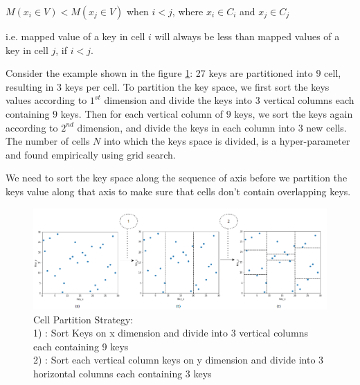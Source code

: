     $ M(x_{i} \in V) <  M(x_{j} \in V)$ when $i<j$, where $x_{i} \in C_{i}$ and $x_{j} \in C_{j}$ 
    
i.e. mapped value of a key in cell $i$ will always be less than mapped values of a key in cell $j$, if $i <j$.

\begin{mscexample}
	Consider the example shown in the figure \ref{fig:Cell_Parttion}: 27 keys are partitioned into $9$ cell, resulting in $3$ keys per cell. To partition the key space, we first sort the keys values according to $1^{st}$ dimension and divide the keys into $3$ vertical columns each containing $9$ keys. Then for each vertical column of $9$ keys, we sort the keys again according to $2^{nd}$ dimension, and divide the keys in each column into $3$ new cells. The number of cells $N$ into which the keys space is divided, is a hyper-parameter and found empirically using grid search.

\end{mscexample}

We need to sort the key space along the sequence of axis before we partition the keys value along that axis to make sure that cells don't contain overlapping keys. \\

\begin{figure}[t]
    \centering
    \includegraphics[width=1\textwidth]{graphs/Grid_Cell_Generation_Strategy_1.png}
    \caption{Cell Partition Strategy: \\
    1) : Sort Keys on x dimension and divide into 3 vertical columns each containing 9 keys\\
    2) : Sort each vertical column keys on y dimension and divide into 3 horizontal columns each containing 3 keys}
    \label{fig:Cell_Parttion}
\end{figure}



